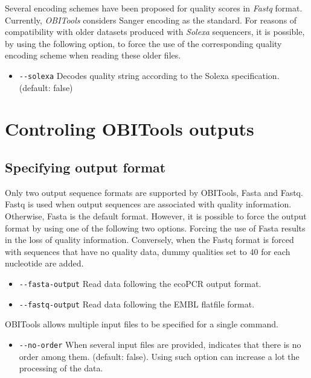 \documentclass[
  letterpaper,
  DIV=11,
  numbers=noendperiod]{scrreprt}
\providecommand{\tightlist}{%
  \setlength{\itemsep}{0pt}\setlength{\parskip}{0pt}}\usepackage{longtable,booktabs,array}
\begin{document}
Several encoding schemes have been proposed for quality scores in
\emph{Fastq} format. Currently, \emph{OBITools} considers Sanger
encoding as the standard. For reasons of compatibility with older
datasets produced with \emph{Solexa} sequencers, it is possible, by
using the following option, to force the use of the corresponding
quality encoding scheme when reading these older files.

\begin{itemize}
\tightlist
\item
  \texttt{-\/-solexa} Decodes quality string according to the Solexa
  specification. (default: false)
\end{itemize}

\hypertarget{controling-obitools-outputs}{%
\chapter{Controling OBITools
outputs}\label{controling-obitools-outputs}}

\hypertarget{specifying-output-format}{%
\section{Specifying output format}\label{specifying-output-format}}

Only two output sequence formats are supported by OBITools, Fasta and
Fastq. Fastq is used when output sequences are associated with quality
information. Otherwise, Fasta is the default format. However, it is
possible to force the output format by using one of the following two
options. Forcing the use of Fasta results in the loss of quality
information. Conversely, when the Fastq format is forced with sequences
that have no quality data, dummy qualities set to 40 for each nucleotide
are added.

\begin{itemize}
\tightlist
\item
  \texttt{-\/-fasta-output} Read data following the ecoPCR output
  format.
\item
  \texttt{-\/-fastq-output} Read data following the EMBL flatfile
  format.
\end{itemize}

OBITools allows multiple input files to be specified for a single
command.

\begin{itemize}
\tightlist
\item
  \texttt{-\/-no-order} When several input files are provided, indicates
  that there is no order among them. (default: false). Using such option
  can increase a lot the processing of the data.
\end{itemize}
\end{document}
